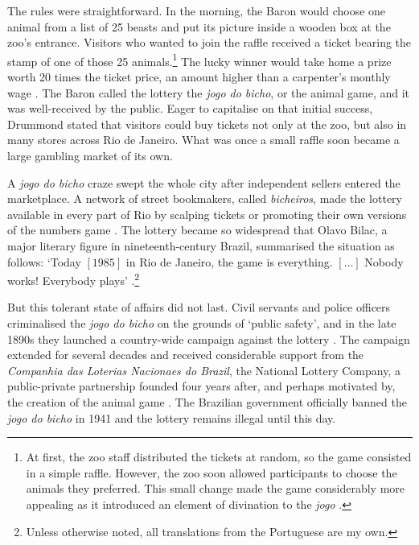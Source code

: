 \documentclass[a4paper,12pt]{article}
\begin{document}
The rules were straightforward. In the morning, the Baron would choose one animal from a list of 25 beasts and put its picture inside a wooden box at the zoo's entrance. Visitors who wanted to join the raffle received a ticket bearing the stamp of one of those 25 animals.\footnote{At first, the zoo staff distributed the tickets at random, so the game consisted in a simple raffle. However, the zoo soon allowed participants to choose the animals they preferred. This small change made the game considerably more appealing as it introduced an element of divination to the \textit{jogo} \citep[71--74]{da1999aguias}.} The lucky winner would take home a prize worth 20 times the ticket price, an amount higher than a carpenter's monthly wage \citep[542]{chazkel2007beyond}. The Baron called the lottery the \textit{jogo do bicho}, or the animal game, and it was well-received by the public. Eager to capitalise on that initial success, Drummond stated that visitors could buy tickets not only at the zoo, but also in many stores across Rio de Janeiro. What was once a small raffle soon became a large gambling market of its own. 

A \textit{jogo do bicho} craze swept the whole city after independent sellers entered the marketplace. A network of street bookmakers, called \textit{bicheiros}, made the lottery available in every part of Rio by scalping tickets or promoting their own versions of the numbers game \citep[37]{chazkel2011laws}. The lottery became so widespread that Olavo Bilac, a major literary figure in nineteenth-century Brazil, summarised the situation as follows: `Today $[1985]$ in Rio de Janeiro, the game is everything. $[\dots]$  Nobody works! Everybody plays' \citep[43]{pacheco1957antologia}.\footnote{Unless otherwise noted, all translations from the Portuguese are my own.} 

But this tolerant state of affairs did not last. Civil servants and police officers criminalised the \textit{jogo do bicho} on the grounds of `public safety', and in the late 1890s they launched a country-wide campaign against the lottery \citep{benatte2002jogos}. The campaign extended for several decades and received considerable support from the \textit{Companhia das Loterias Nacionaes do Brazil}, the National Lottery Company, a public-private partnership founded four years after, and perhaps motivated by, the creation of the animal game \citep[82]{da1999aguias}. The Brazilian government officially banned the \textit{jogo do bicho} in 1941 and the lottery remains illegal until this day.  
 
\end{document}
